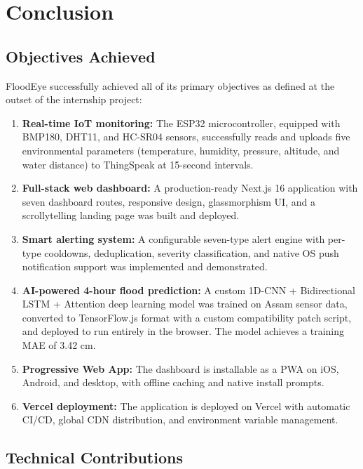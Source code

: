 ﻿%
\chapter{Conclusion}

\section{Objectives Achieved}

FloodEye successfully achieved all of its primary objectives as defined at the outset of the internship project:

\begin{enumerate}[leftmargin=1.5em]
  \item \textbf{Real-time IoT monitoring:} The ESP32 microcontroller, equipped with BMP180, DHT11, and HC-SR04 sensors, successfully reads and uploads five environmental parameters (temperature, humidity, pressure, altitude, and water distance) to ThingSpeak at 15-second intervals.
  \item \textbf{Full-stack web dashboard:} A production-ready Next.js 16 application with seven dashboard routes, responsive design, glassmorphism UI, and a scrollytelling landing page was built and deployed.
  \item \textbf{Smart alerting system:} A configurable seven-type alert engine with per-type cooldowns, deduplication, severity classification, and native OS push notification support was implemented and demonstrated.
  \item \textbf{AI-powered 4-hour flood prediction:} A custom 1D-CNN + Bidirectional LSTM + Attention deep learning model was trained on Assam sensor data, converted to TensorFlow.js format with a custom compatibility patch script, and deployed to run entirely in the browser. The model achieves a training MAE of 3.42 cm.
  \item \textbf{Progressive Web App:} The dashboard is installable as a PWA on iOS, Android, and desktop, with offline caching and native install prompts.
  \item \textbf{Vercel deployment:} The application is deployed on Vercel with automatic CI/CD, global CDN distribution, and environment variable management.
\end{enumerate}

\section{Technical Contributions}

